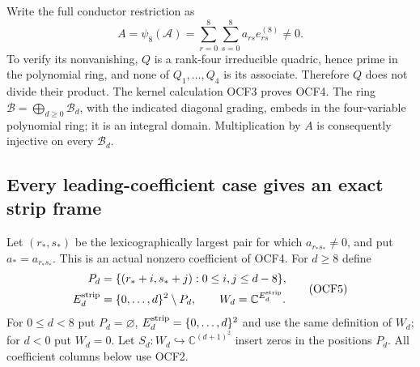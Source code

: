 \documentclass[11pt]{article}
\begin{document}
Write the full conductor restriction as
\[
 A=\psi_8(\mathcal A)
     =\sum_{r=0}^8\sum_{s=0}^8 a_{rs}e_{rs}^{(8)}\ne0.
 \tag{OCF4}
\]
To verify its nonvanishing, $Q$ is a rank-four irreducible quadric,
hence prime in the polynomial ring, and none of $Q_1,\ldots,Q_4$
is its associate. Therefore $Q$ does not divide their product.
The kernel calculation OCF3 proves OCF4. The ring
$\mathcal B=\bigoplus_{d\geq0}\mathcal B_d$, with the indicated
diagonal grading, embeds in the four-variable polynomial ring;
it is an integral domain. Multiplication by $A$ is consequently
injective on every $\mathcal B_d$.

\subsection{Every leading-coefficient case gives an exact strip frame}

Let $(r_*,s_*)$ be the lexicographically largest pair for which
$a_{r_*s_*}\ne0$, and put $a_*=a_{r_*s_*}$. This is an
actual nonzero coefficient of OCF4. For $d\geq8$ define
\[
 \begin{split}
 P_d&=\{(r_*+i,s_*+j):0\leq i,j\leq d-8\},\\
 E_d^{\rm strip}&=\{0,\ldots,d\}^2\setminus P_d,\qquad
 W_d=\mathbb C^{E_d^{\rm strip}}.
 \end{split}\tag{OCF5}
\]
For $0\leq d<8$ put $P_d=\varnothing$,
$E_d^{\rm strip}=\{0,\ldots,d\}^2$ and use the same definition
of $W_d$; for $d<0$ put $W_d=0$. Let
$S_d:W_d\hookrightarrow\mathbb C^{(d+1)^2}$ insert zeros in
the positions $P_d$. All coefficient columns below use OCF2.
\end{document}

